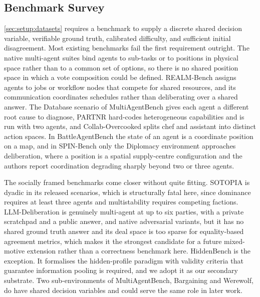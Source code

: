 \newcommand{\fillin}[1]{\textcolor{red}{\textbf{[FILL: #1]}}}

\subsection{Benchmark Survey}
\label{app:benchmarks}

\autoref{sec:setup:datasets} requires a benchmark to supply a discrete shared
decision variable, verifiable ground truth, calibrated difficulty, and sufficient
initial disagreement. Most existing benchmarks fail the first requirement
outright. The native multi-agent suites bind agents to sub-tasks or to positions
in physical space rather than to a common set of options, so there is no shared
position space in which a vote composition could be defined. REALM-Bench
\citep{geng2025realmbench} assigns agents to jobs or workflow nodes that compete
for shared resources, and its communication coordinates schedules rather than
deliberating over a shared answer. The Database scenario of MultiAgentBench
\citep{zhu2025multiagentbench} gives each agent a different root cause to
diagnose, PARTNR \citep{chang2024partnr} hard-codes heterogeneous capabilities and
is run with two agents, and Collab-Overcooked \citep{sun2025collaboverco} splits chef and
assistant into distinct action spaces. In BattleAgentBench
\citep{wang2024battleagentbench} the state of an agent is a coordinate position on a map, and in SPIN-Bench \citep{yao2025spinbench} only the Diplomacy
environment approaches deliberation, where a position is a spatial supply-centre
configuration and the authors report coordination degrading sharply beyond two or
three agents.

The socially framed benchmarks come closer without quite fitting. SOTOPIA
\citep{zhou2024sotopia} is dyadic in its released scenarios, which is structurally fatal here,
since dominance requires at least three agents and multistability requires
competing factions. LLM-Deliberation \citep{abdelnabi2024cooperation} is genuinely
multi-agent at up to six parties, with a private scratchpad and a public answer, and native adversarial variants,
but it has no shared ground truth answer and its deal space is too sparse
for equality-based agreement metrics, which makes it the strongest candidate for a
future mixed-motive extension rather than a correctness benchmark here.
HiddenBench \citep{li2026hiddenbench} is the exception. It formalises the
hidden-profile paradigm \citep{stasser1985pooling, schulzhardt2012synergy} with
validity criteria that guarantee information pooling is required, and we adopt it
as our secondary substrate. Two sub-environments of MultiAgentBench, Bargaining and
Werewolf, do have shared decision variables and could serve the same role in later
work.


